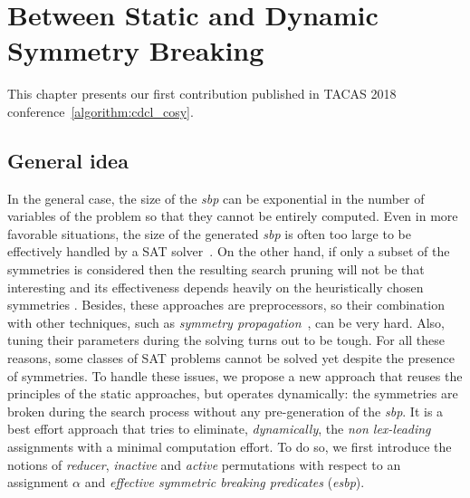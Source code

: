 ﻿\chapter{Between Static and Dynamic\\ Symmetry Breaking}\label{chap:symmSAT}
\minitoc
This chapter presents our first contribution published in TACAS 2018 conference~\ref{algorithm:cdcl_cosy}. 
\section{General idea}
In the general case,
the size of the \textit{sbp} can be exponential in the number of variables of
the problem so that they cannot be entirely computed. Even in more favorable
situations, the size of the generated \textit{sbp} is often too large to be
effectively handled by a SAT solver~\cite{Luks2004}. On the other hand, if
only a subset of the symmetries is considered then the resulting search pruning
will not be that interesting and its effectiveness depends heavily on the
heuristically chosen symmetries \cite{biere2009handbook}. Besides, these approaches
are preprocessors, so their combination with other techniques, such as
\emph{symmetry propagation}~\cite{Devriendt12}, can be very hard. Also, tuning
their parameters during the solving turns out to be tough. For all
these reasons, some classes of SAT problems cannot be solved yet despite
the presence of symmetries.
To handle these issues, we propose a new
approach that reuses the principles of the static approaches, but operates
dynamically: the symmetries are broken during the search process without any
pre-generation of the \textit{sbp}. It is a best effort approach that tries to eliminate,
\textit{dynamically}, the \textit{non lex-leading} assignments with a minimal
computation effort. To do so, we first introduce the notions of
\textit{reducer}, \textit{inactive} and \textit{active} permutations with
respect to an assignment $\alpha$ and \emph{effective symmetric breaking predicates} (\emph{esbp}).

